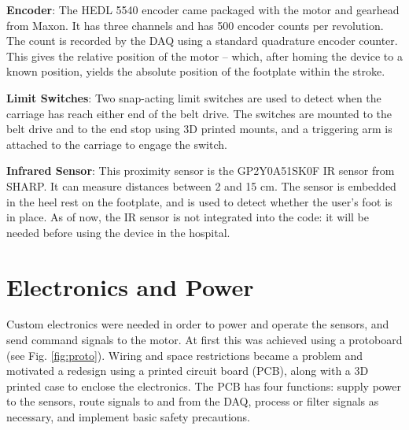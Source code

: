 \documentclass[12pt]{report}
\begin{document}
	\textbf{Encoder}: The HEDL 5540 encoder came packaged with the motor and gearhead from Maxon. It has three channels and has 500 encoder counts per revolution. The count is recorded by the DAQ using a standard quadrature encoder counter. This gives the relative position of the motor -- which, after homing the device to a known position, yields the absolute position of the footplate within the stroke. 
	
	\textbf{Limit Switches}: Two snap-acting limit switches are used to detect when the carriage has reach either end of the belt drive. The switches are mounted to the belt drive and to the end stop using 3D printed mounts, and a triggering arm is attached to the carriage to engage the switch. 
	
	\textbf{Infrared Sensor}: This proximity sensor is the GP2Y0A51SK0F IR sensor from SHARP. It can measure distances between 2 and 15 cm. The sensor is embedded in the heel rest on the footplate, and is used to detect whether the user's foot is in place. As of now, the IR sensor is not integrated into the code: it will be needed before using the device in the hospital.
	
	
		
	\section{Electronics and Power}
	
	Custom electronics were needed in order to power and operate the sensors, and send command signals to the motor. At first this was achieved using a protoboard (see Fig. \ref{fig:proto}). Wiring and space restrictions became a problem and motivated a redesign using a printed circuit board (PCB), along with a 3D printed case to enclose the electronics. The PCB has four functions: supply power to the sensors, route signals to and from the DAQ, process or filter signals as necessary, and implement basic safety precautions. 
	
\end{document}
